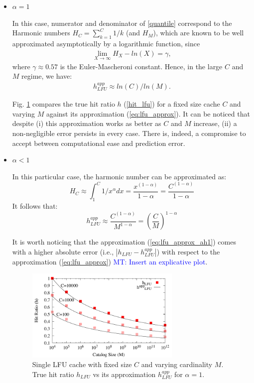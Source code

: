 \documentclass[10pt]{article}
\newcommand{\MT}[1]{\textcolor{blue}{MT: #1}}
\begin{document}
\begin{itemize}
  \item $\alpha = 1$
  
  In this case, numerator and denominator of \ref{quantile} correspond to the Harmonic numbers $H_C = \sum_{k=1}^C  1/k$ (and $H_M$), which are known to be well approximated asymptotically by a logarithmic function, since
  \begin{align}
  \lim_{X\rightarrow \infty} H_X  - ln(X) = \gamma ,
  \end{align}
  \noindent where $\gamma\approx 0.57$ is the Euler-Mascheroni constant. Hence, in the large $C$ and $M$ regime, we have:
  \begin{align}\label{eq:lfu_approx}
  h^{app}_{LFU}\approx ln(C)/ln(M). 
  \end{align}

  Fig. \ref{fig:lfu_approx_a1} compares the true hit ratio $h$ (\ref{hit_lfu}) for a fixed size cache $C$ and varying $M$ against its approximation (\ref{eq:lfu_approx}). It can be noticed that despite (i) this approximation works as better as $C$ and $M$ increase, (ii) a non-negligible error persists in every case. There is, indeed, a compromise to accept between computational ease and prediction error.  

  \item $\alpha < 1$

  In this particular case, the harmonic number can be approximated as:
  \begin{equation}
  H_C \approx \int_{1}^{C} 1/x^{\alpha} dx = \frac{x^{(1-\alpha)}}{1-\alpha} = \frac{C^{(1-\alpha)}}{1-\alpha}
  \end{equation}
  It follows that:
  \begin{equation}\label{eq:lfu_approx_ah1}
  h^{app}_{LFU} \approx \frac{C^{(1-\alpha)}}{M^{1-\alpha}} = \left(\frac{C}{M}\right)^{1-\alpha}
  \end{equation}

  It is worth noticing that the approximation (\ref{eq:lfu_approx_ah1}) comes with a higher absolute error (i.e., $|h_{LFU}-h^{app}_{LFU}|$) with respect to the approximation (\ref{eq:lfu_approx}) \MT{Insert an explicative plot}.
  

 \begin{figure}[t] 
   \centering
     \includegraphics[width=0.7\textwidth]{QuellaSporcaDozzina.pdf}
   \caption{Single LFU cache with fixed size $C$ and varying cardinality $M$. True hit ratio $h_{LFU}$ vs its approximation $h^{app}_{LFU}$ for $\alpha=1$.}
   \label{fig:lfu_approx_a1}
\end{figure} 

\end{itemize}
\end{document}
